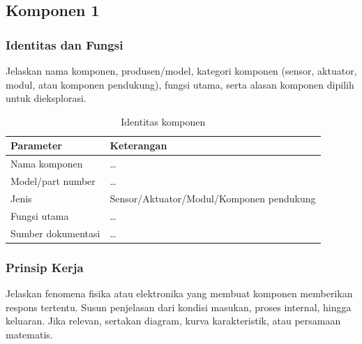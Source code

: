 
\subsection{Komponen 1}
\label{subsec:komponen-01}

\subsubsection{Identitas dan Fungsi}
Jelaskan nama komponen, produsen/model, kategori komponen (sensor, aktuator,
modul, atau komponen pendukung), fungsi utama, serta alasan komponen dipilih
untuk dieksplorasi.

\begin{table}[H]
\centering
\caption{Identitas komponen}
\begin{tabularx}{\textwidth}{@{}lX@{}}
\toprule
Parameter & Keterangan \\
\midrule
Nama komponen & \dots \\
Model/part number & \dots \\
Jenis & Sensor/Aktuator/Modul/Komponen pendukung \\
Fungsi utama & \dots \\
Sumber dokumentasi & \dots \\
\bottomrule
\end{tabularx}
\end{table}

\subsubsection{Prinsip Kerja}
Jelaskan fenomena fisika atau elektronika yang membuat komponen memberikan
respons tertentu. Susun penjelasan dari kondisi masukan, proses internal,
hingga keluaran. Jika relevan, sertakan diagram, kurva karakteristik, atau
persamaan matematis.


